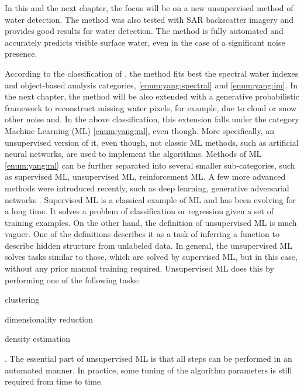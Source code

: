 In this and the next chapter, the focus will be on a new unsupervised method of water detection. The method was also tested with SAR backscatter imagery and provides good results for water detection. The method is fully automated and accurately predicts visible surface water, even in the case of a significant noise presence. 

According to the classification of \citep{yang2015landsat}, the method fits best the spectral water indexes and object-based analysis categories, \ref{enum:yang:spectral} and \ref{enum:yang:im}. In the next chapter, the method will be also extended with a generative probabilistic framework to reconstruct missing water pixels, for example, due to cloud or snow other noise and. In the above classification, this extension falls under the category Machine Learning (ML) \ref{enum:yang:ml}, even though. More specifically, an unsupervised version of it, even though, not classic ML methods, such as artificial neural networks, are used to implement the algorithms. Methods of ML \ref{enum:yang:ml} can be further separated into several smaller sub-categories, such as supervised ML, unsupervised ML, reinforcement ML. A few more advanced methods were introduced recently, such as deep learning, generative adversarial networks \citep{goodfellow2014generative}. Supervised ML is a classical example of ML and has been evolving for a long time. It solves a problem of classification or regression given a set of training examples. On the other hand, the definition of unsupervised ML is much vaguer. One of the definitions describes it as a task of inferring a function to describe hidden structure from unlabeled data. In general, the unsupervised ML solves tasks similar to those, which are solved by supervised ML, but in this case, without any prior manual training required. Unsupervised ML does this by performing one of the following tasks: 
\begin{enumerate*}[label=(\emph{\arabic*})]
	\item \label {enum:ml2:clustering} clustering
	\item \label {enum:ml2:dimentionality-reduction} dimensionality reduction
	\item \label {enum:ml2:density} density estimation
\end{enumerate*}.
The essential part of unsupervised ML is that all steps can be performed in an automated manner. In practice, some tuning of the algorithm parameters is still required from time to time.

